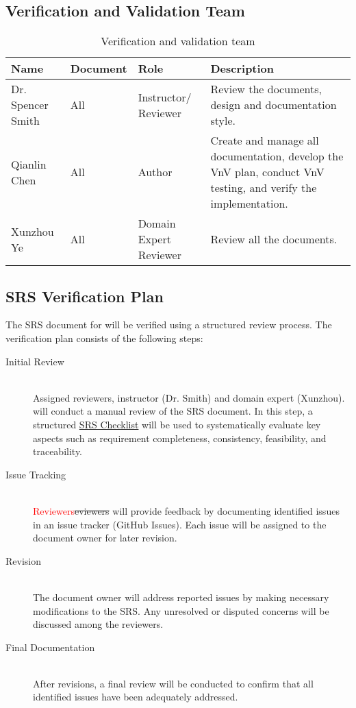 \documentclass[12pt, titlepage]{article}
\newcommand{\add}{\textcolor{red}}
\begin{document}
\subsection{Verification and Validation Team} \label{3.1}
\begin{center}
\begin{table}[h]
    \begin{tabular}{ |l|l|p{2cm}|p{5cm}| }
    \hline
    \textbf{Name} & \textbf{Document} & \textbf{Role} & \textbf{Description} \\
    \hline
     Dr. Spencer Smith & All & Instructor/ Reviewer & Review the documents, design and documentation style. \\
     \hline
     Qianlin Chen & All & Author & Create and manage all documentation, develop the VnV plan, conduct VnV testing, and verify the implementation.\\
     \hline
     Xunzhou Ye & All & Domain Expert Reviewer & Review all the documents. \\
    \hline
    \end{tabular} %
\caption{Verification and validation team}
\label{vnvteam}
\end{table}
\end{center}

\subsection{SRS Verification Plan} \label{3.2}
The SRS document for \progname will be verified using a structured review
process. The verification plan consists of the following steps:
\begin{description}
\item[Initial Review] \hfill \\
  Assigned reviewers, instructor (Dr. Smith) and domain expert
  (Xunzhou). will conduct a manual review of the SRS document. In this step, a
  structured
  \href{https://github.com/smiths/capTemplate/blob/9251702fdcb9800c59f6ed3d11d91e2bd62fca6d/docs/Checklists/SRS-Checklist.pdf}{SRS
    Checklist} will be used to systematically evaluate key aspects such as
  requirement completeness, consistency, feasibility, and traceability.
\item[Issue Tracking] \hfill \\
  \add{Reviewers}\st{eviewers} will provide feedback by documenting identified issues in an issue
  tracker (GitHub Issues). Each issue will be
  assigned to the document owner for later revision.
\item[Revision] \hfill \\
  The document owner will address reported issues by making necessary
  modifications to the SRS. Any unresolved or disputed concerns will be
  discussed among the reviewers.
\item[Final Documentation] \hfill \\
  After revisions, a final review will be conducted to confirm that all
  identified issues have been adequately addressed.
\end{description}
\end{document}
